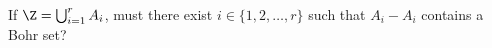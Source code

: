 \begin{question} \label{q:kr}
If $\Z = \bigcup_{i=1}^r A_i$, must there exist $i \in \{1, 2, \ldots, r\}$ such that $A_i - A_i$ contains a Bohr set?
\end{question}
